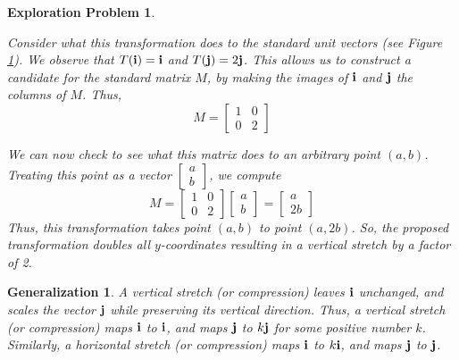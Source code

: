 \documentclass{ximera}
\renewcommand{\vec}[1]{{\bf #1}}
\newtheorem{general}{Generalization}
\newtheorem{initprob}{Exploration Problem}
\begin{document}
\begin{initprob}
\begin{center}
\end{center}
  \label{fig:vstretchvectors} 
Consider what this transformation does to the standard unit vectors (see Figure \ref{fig:vstretchvectors}).  We observe that $T(\vec{i})=\vec{i}$ and $T(\vec{j})=2\vec{j}$.  This allows us to construct a candidate for the standard matrix $M$, by making the images of $\vec{i}$ and $\vec{j}$ the columns of $M$.  Thus, 
$$M=\begin{bmatrix}
1 & 0\\
0 & 2
\end{bmatrix}$$

We can now check to see what this matrix does to an arbitrary point $(a, b)$.  Treating this point as a vector $\begin{bmatrix}a\\b\end{bmatrix}$, we compute
$$M=\begin{bmatrix}
1 & 0\\
0 & 2
\end{bmatrix}\begin{bmatrix}a\\b\end{bmatrix}=\begin{bmatrix}a\\2b\end{bmatrix}$$
 Thus, this transformation takes point $(a, b)$ to point $(a, 2b)$.  So, the proposed transformation doubles all $y$-coordinates resulting in a vertical stretch by a factor of 2.
\end{initprob}






\begin{general} A vertical stretch (or compression) leaves $\vec{i}$ unchanged, and scales the vector $\vec{j}$ while preserving its vertical direction.  Thus, a vertical stretch (or compression) maps $\vec{i}$ to $\vec{i}$, and maps $\vec{j}$ to $k\vec{j}$ for some positive number $k$.  Similarly, a horizontal stretch (or compression) maps $\vec{i}$ to $k\vec{i}$, and maps $\vec{j}$ to $\vec{j}$.
\end{general}
\end{document}
